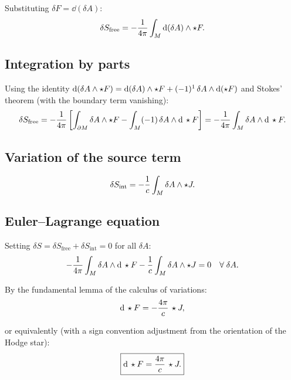 Substituting $\delta F = \dd(\delta A)$:
\begin{equation}
\delta S_{\text{free}} = -\frac{1}{4\pi}\int_M \mathrm{d}(\delta A) \wedge \star F.
\end{equation}

\subsection{Integration by parts}

Using the identity $\mathrm{d}(\delta A \wedge \star F) = \mathrm{d}(\delta A) \wedge \star F + (-1)^1\,\delta A \wedge \mathrm{d}(\star F)$ and Stokes' theorem (with the boundary term vanishing):
\begin{equation}
\delta S_{\text{free}} = -\frac{1}{4\pi}\left[\int_{\partial M} \delta A \wedge \star F - \int_M (-1)\,\delta A \wedge \mathrm{d}\,\star F\right] = -\frac{1}{4\pi}\int_M \delta A \wedge \mathrm{d}\,\star F.
\end{equation}

\subsection{Variation of the source term}

\begin{equation}
\delta S_{\text{int}} = -\frac{1}{c}\int_M \delta A \wedge \star J.
\end{equation}

\subsection{Euler--Lagrange equation}

Setting $\delta S = \delta S_{\text{free}} + \delta S_{\text{int}} = 0$ for all $\delta A$:
\begin{equation}
-\frac{1}{4\pi}\int_M \delta A \wedge \mathrm{d}\,\star F - \frac{1}{c}\int_M \delta A \wedge \star J = 0 \quad \forall\;\delta A.
\end{equation}

By the fundamental lemma of the calculus of variations:
\begin{equation}
\mathrm{d}\,\star F = -\frac{4\pi}{c}\,\star J,
\end{equation}

or equivalently (with a sign convention adjustment from the orientation of the Hodge star):
\begin{equation}
\boxed{\mathrm{d}\,\star F = \frac{4\pi}{c}\,\star J.}
\end{equation}

